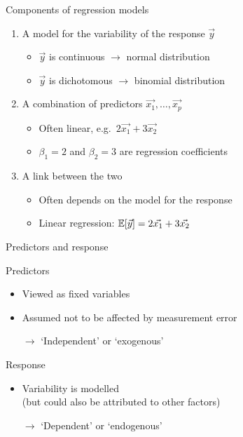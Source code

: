\begin{frame}{Components of regression models}
    \begin{enumerate}[(1)]
        \item A model for the \alert{variability} of the response $\vec{y}$
              \begin{itemize}
                  \item $\vec{y}$ is continuous $\rightarrow$ normal distribution
                  \item $\vec{y}$ is dichotomous $\rightarrow$ binomial distribution \\[\bigskipamount]
              \end{itemize}
        \pause
        \item A \alert{combination of predictors} $\vec{x_{1}}, \ldots, \vec{x_{p}}$
              \begin{itemize}
                  \item Often linear, e.g.\ $2 \vec{x_{1}} + 3 \vec{x_{2}}$
                  \item $\beta_{1} = 2$ and $\beta_{2} = 3$ are
                        \alert{regression coefficients} \\[\bigskipamount]
              \end{itemize}
        \pause
        \item A \alert{link} between the two
              \begin{itemize}
                  \item Often depends on the model for the response
                  \item Linear regression:
                        $\mathbb{E}\!\left[ \vec{y} \right] = 2 \vec{x_{1}} + 3 \vec{x_{2}}$
              \end{itemize}
    \end{enumerate}
\end{frame}

\begin{frame}{Predictors and response}
    \begin{block}{Predictors}
        \begin{itemize}
            \item Viewed as \alert{fixed} variables
            \item Assumed not to be affected by \alert{measurement error}
            \item[$\rightarrow$] `Independent' or `exogenous'
        \end{itemize}
    \end{block}
    \vfill
    \begin{block}{Response}
        \begin{itemize}
            \item \alert{Variability is modelled} \\
                  (but could also be attributed to other factors)
            \item[$\rightarrow$] `Dependent' or `endogenous'
        \end{itemize}
    \end{block}
\end{frame}

